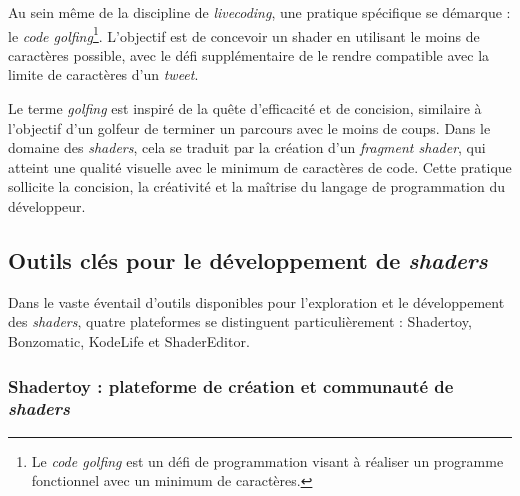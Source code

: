 Au sein même de la discipline de \textit{livecoding}, une pratique spécifique se démarque : le \textit{code golfing}\footnote{Le \textit{code golfing} est un défi de programmation visant à réaliser un programme fonctionnel avec un minimum de caractères.}. L'objectif est de concevoir un shader en utilisant le moins de caractères possible, avec le défi supplémentaire de le rendre compatible avec la limite de caractères d'un \textit{tweet}.

Le terme \textit{golfing} est inspiré de la quête d'efficacité et de concision, similaire à l'objectif d'un golfeur de terminer un parcours avec le moins de coups. Dans le domaine des \textit{shaders}, cela se traduit par la création d'un \textit{fragment shader}, qui atteint une qualité visuelle avec le minimum de caractères de code. Cette pratique sollicite la concision, la créativité et la maîtrise du langage de programmation du développeur.

\subsection*{Outils clés pour le développement de \textit{shaders}}
Dans le vaste éventail d'outils disponibles pour l'exploration et le développement des \textit{shaders}, quatre plateformes se distinguent particulièrement : Shadertoy, Bonzomatic, KodeLife et ShaderEditor.





\subsubsection*{Shadertoy : plateforme de création et communauté de \textit{shaders}}

